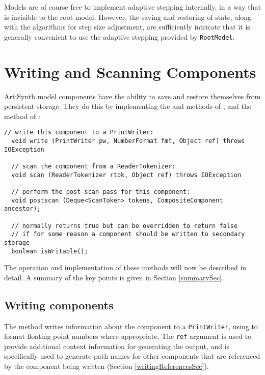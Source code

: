 \documentclass{article}
\begin{document}
\begin{sideblock}
Models are of course free to implement adaptive stepping internally, in a
way that is invisible to the root model. However, the saving and
restoring of state, along with the algorithms for step size
adjustment, are sufficiently intricate that it is generally
convenient to use the adaptive stepping provided by {\tt RootModel}.
\end{sideblock}

\section{Writing and Scanning Components}
\label{writingAndScanningSec}

ArtiSynth model components have the ability to save and restore
themselves from persistent storage. They do this by implementing the
 and 
 methods of
, and the 
method of :

\begin{lstlisting}[]
  // write this component to a PrintWriter:
  void write (PrintWriter pw, NumberFormat fmt, Object ref) throws IOException

  // scan the component from a ReaderTokenizer:
  void scan (ReaderTokenizer rtok, Object ref) throws IOException

  // perform the post-scan pass for this component:
  void postscan (Deque<ScanToken> tokens, CompositeComponent ancestor);

  // normally returns true but can be overridden to return false 
  // if for some reason a component should be written to secondary storage
  boolean isWritable();
\end{lstlisting}

The operation and implementation of these methods will now be
described in detail. A summary of the key points is given in Section
\ref{summarySec}.

\subsection{Writing components}

The  method writes
information about the component to a {\tt PrintWriter}, using
 to format floating point
numbers where appropriate. The {\tt ref} argument is used to provide
additional context information for generating the output, and is
specifically used to generate path names for other components
that are referenced by the component being written
(Section \ref{writingReferencesSec}).
\end{document}
